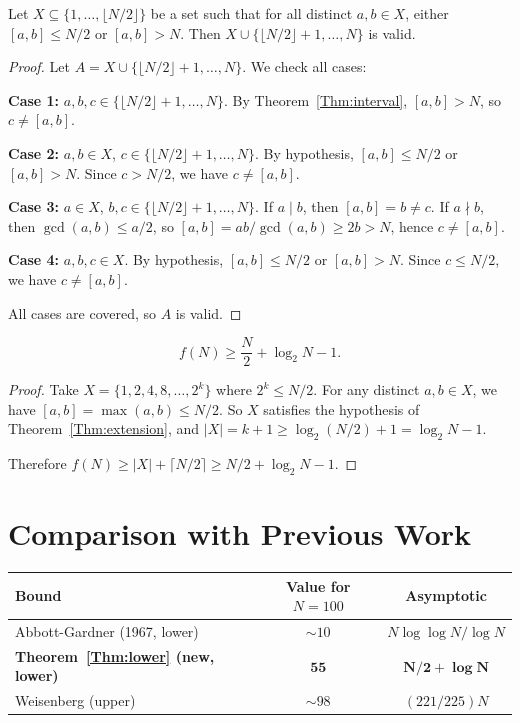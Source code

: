 \documentclass[11pt]{article}
\begin{document}
\begin{theorem}\label{Thm:extension}
Let $X \subseteq \{1, \ldots, \lfloor N/2 \rfloor\}$ be a set such that for all distinct $a, b \in X$, either $[a,b] \leq N/2$ or $[a,b] > N$. Then $X \cup \{\lfloor N/2 \rfloor + 1, \ldots, N\}$ is valid.
\end{theorem}

\begin{proof}
Let $A = X \cup \{\lfloor N/2 \rfloor + 1, \ldots, N\}$. We check all cases:

\textbf{Case 1:} $a, b, c \in \{\lfloor N/2 \rfloor + 1, \ldots, N\}$. By Theorem~\ref{Thm:interval}, $[a,b] > N$, so $c \neq [a,b]$.

\textbf{Case 2:} $a, b \in X$, $c \in \{\lfloor N/2 \rfloor + 1, \ldots, N\}$. By hypothesis, $[a,b] \leq N/2$ or $[a,b] > N$. Since $c > N/2$, we have $c \neq [a,b]$.

\textbf{Case 3:} $a \in X$, $b, c \in \{\lfloor N/2 \rfloor + 1, \ldots, N\}$. If $a \mid b$, then $[a,b] = b \neq c$. If $a \nmid b$, then $\gcd(a,b) \leq a/2$, so $[a,b] = ab/\gcd(a,b) \geq 2b > N$, hence $c \neq [a,b]$.

\textbf{Case 4:} $a, b, c \in X$. By hypothesis, $[a,b] \leq N/2$ or $[a,b] > N$. Since $c \leq N/2$, we have $c \neq [a,b]$.

All cases are covered, so $A$ is valid.
\end{proof}

\begin{theorem}\label{Thm:lower}
$$f(N) \geq \frac{N}{2} + \log_2 N - 1.$$
\end{theorem}

\begin{proof}
Take $X = \{1, 2, 4, 8, \ldots, 2^k\}$ where $2^k \leq N/2$. For any distinct $a, b \in X$, we have $[a,b] = \max(a,b) \leq N/2$. So $X$ satisfies the hypothesis of Theorem~\ref{Thm:extension}, and $|X| = k+1 \geq \log_2(N/2) + 1 = \log_2 N - 1$.

Therefore $f(N) \geq |X| + \lceil N/2 \rceil \geq N/2 + \log_2 N - 1$.
\end{proof}

\section{Comparison with Previous Work}

\begin{center}
\begin{tabular}{|l|c|c|}
\hline
\textbf{Bound} & \textbf{Value for $N = 100$} & \textbf{Asymptotic} \\
\hline
Abbott-Gardner (1967, lower) & $\sim 10$ & $N \log\log N / \log N$ \\
\hline
\textbf{Theorem~\ref{Thm:lower} (new, lower)} & $\mathbf{55}$ & $\mathbf{N/2 + \log N}$ \\
\hline
Weisenberg (upper) & $\sim 98$ & $(221/225)N$ \\
\hline
\end{tabular}
\end{center}
\end{document}
